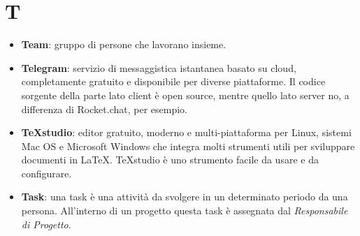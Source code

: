 \section{T}
\begin{itemize}
	\item \textbf{Team}: gruppo di persone che lavorano insieme.
	\item \textbf{Telegram}: servizio di messaggistica istantanea basato su cloud, completamente gratuito e disponibile per diverse piattaforme. Il codice sorgente della parte lato client è open source, mentre quello lato server no, a differenza di Rocket.chat, per esempio.
	\item \textbf{TeXstudio}: editor gratuito, moderno e multi-piattaforma per Linux, sistemi Mac OS e Microsoft Windows che integra molti strumenti utili per sviluppare documenti in \LaTeX. TeXstudio è uno strumento facile da usare e da configurare.
	\item \textbf{Task}: una task è una attività da svolgere in un determinato periodo da una persona. All'interno di un progetto questa task è assegnata dal \textit{Responsabile di Progetto}.
\end{itemize}


